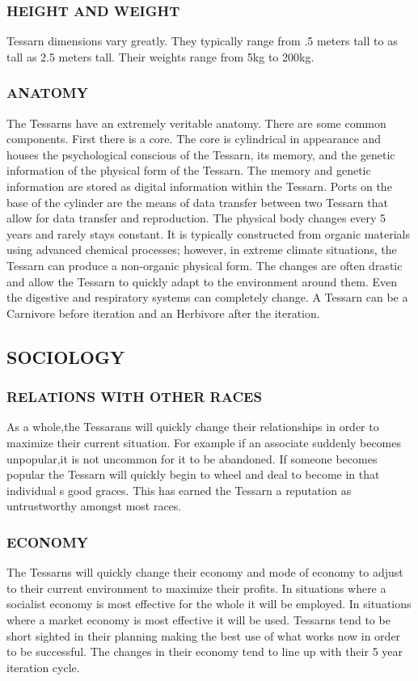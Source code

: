\subsubsection{HEIGHT AND WEIGHT}
Tessarn dimensions vary greatly.  They typically range from .5 meters tall to
as tall as 2.5 meters tall.  Their weights range from 5kg to 200kg.
\subsubsection{ANATOMY}
The Tessarns have an extremely veritable anatomy.  There are some common
components.  First there is a core.  The core is cylindrical in appearance and
houses the psychological conscious of the Tessarn, its memory, and the genetic
information of the physical form of the Tessarn.  The memory and genetic
information are stored as digital information within the Tessarn.  Ports on the
base of the cylinder are the means of data transfer between two Tessarn that
allow for data transfer and reproduction.  The physical body changes every 5
years and rarely stays constant.  It is typically constructed from organic
materials using advanced chemical processes; however, in extreme climate
situations, the Tessarn can produce a non-organic physical form.  The changes
are often drastic and allow the Tessarn to quickly adapt to the environment
around them.   Even the digestive and respiratory systems can completely
change.  A Tessarn can be a Carnivore before iteration and an Herbivore after
the iteration.
\subsection{SOCIOLOGY}
\subsubsection{RELATIONS WITH OTHER RACES}
As a whole,the Tessarans will quickly change their relationships in order to
maximize their current situation.  For example if an associate suddenly becomes
unpopular,it is not uncommon for it to be abandoned.  If someone becomes
popular the Tessarn will quickly begin to wheel and deal to become in that
individual s good graces.  This has earned the Tessarn a reputation as
untrustworthy amongst most races.
\subsubsection{ECONOMY}
The Tessarns will quickly change their economy and mode of economy to adjust to
their current environment to maximize their profits.  In situations where a
socialist economy is most effective for the whole it will be employed.  In
situations where a market economy is most effective it will be used.  Tessarns
tend to be short sighted in their planning making the best use of what works
now in order to be successful.  The changes in their economy tend to line up
with their 5 year iteration cycle.
